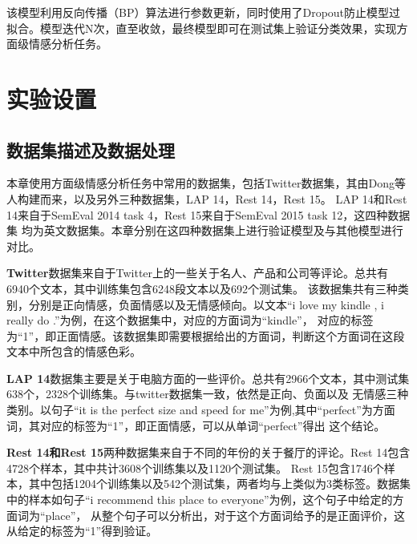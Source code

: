 该模型利用反向传播（BP）算法进行参数更新，同时使用了Dropout防止模型过拟合。模型迭代N次，直至收敛，最终模型即可在测试集上验证分类效果，实现方面级情感分析任务。

\section{实验设置}
\subsection{数据集描述及数据处理}
本章使用方面级情感分析任务中常用的数据集，包括Twitter数据集，其由Dong等人构建而来，以及另外三种数据集，LAP 14，Rest 14，Rest 15。
LAP 14和Rest 14来自于SemEval 2014 task 4，Rest 15来自于SemEval 2015 task 12，这四种数据集
均为英文数据集。本章分别在这四种数据集上进行验证模型及与其他模型进行对比。

\textbf{Twitter}数据集来自于Twitter上的一些关于名人、产品和公司等评论。总共有6940个文本，其中训练集包含6248段文本以及692个测试集。
该数据集共有三种类别，分别是正向情感，负面情感以及无情感倾向。以文本“i love my kindle , i really do .”为例，在这个数据集中，对应的方面词为“kindle”，
对应的标签为“1”，即正面情感。该数据集即需要根据给出的方面词，判断这个方面词在这段文本中所包含的情感色彩。

\textbf{LAP 14}数据集主要是关于电脑方面的一些评价。总共有2966个文本，其中测试集638个，2328个训练集。与twitter数据集一致，依然是正向、负面以及
无情感三种类别。以句子“it is the perfect size and speed for me”为例,其中“perfect”为方面词，其对应的标签为“1”，即正面情感，可以从单词“perfect”得出
这个结论。

\textbf{Rest 14和Rest 15}两种数据集来自于不同的年份的关于餐厅的评论。Rest 14包含4728个样本，其中共计3608个训练集以及1120个测试集。
Rest 15包含1746个样本，其中包括1204个训练集以及542个测试集，两者均与上类似为3类标签。数据集中的样本如句子“i recommend this place to everyone”为例，这个句子中给定的方面词为“place”，
从整个句子可以分析出，对于这个方面词给予的是正面评价，这从给定的标签为“1”得到验证。

